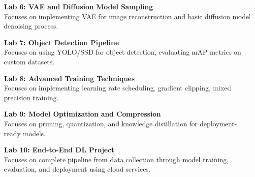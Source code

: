 \noindent\textbf{Lab 6: VAE and Diffusion Model Sampling} \\
Focuses on implementing VAE for image reconstruction and basic diffusion model denoising process.

\vspace{0.2cm}

\noindent\textbf{Lab 7: Object Detection Pipeline} \\
Focuses on using YOLO/SSD for object detection, evaluating mAP metrics on custom datasets.

\vspace{0.2cm}

\noindent\textbf{Lab 8: Advanced Training Techniques} \\
Focuses on implementing learning rate scheduling, gradient clipping, mixed precision training.

\vspace{0.2cm}

\noindent\textbf{Lab 9: Model Optimization and Compression} \\
Focuses on pruning, quantization, and knowledge distillation for deployment-ready models.

\vspace{0.2cm}

\noindent\textbf{Lab 10: End-to-End DL Project} \\
Focuses on complete pipeline from data collection through model training, evaluation, and deployment using cloud services.

\vspace{0.2cm}

\newpage
{}
